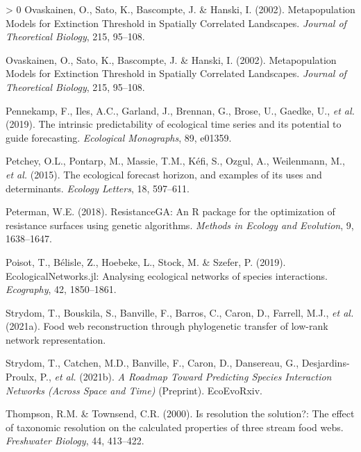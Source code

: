 \documentclass[11pt]{article}
\newlength{\cslhangindent}
\newenvironment{CSLReferences}[3] %
 {%
  \setlength{\parindent}{0pt}
  \ifodd #1 \everypar{\setlength{\hangindent}{\cslhangindent}}\ignorespaces\fi
  \ifnum #2 > 0
  \setlength{\parskip}{#2\baselineskip}
  \fi
 }%
 {}
\begin{document}
\begin{CSLReferences}{1}{0}
\leavevmode\hypertarget{ref-Ovaskainen2002MetMod}{}%
Ovaskainen, O., Sato, K., Bascompte, J. \& Hanski, I. (2002).
Metapopulation Models for Extinction Threshold in Spatially Correlated
Landscapes. \emph{Journal of Theoretical Biology}, 215, 95--108.

\leavevmode\hypertarget{ref-Ovaskainen2002MetMod}{}%
Ovaskainen, O., Sato, K., Bascompte, J. \& Hanski, I. (2002).
Metapopulation Models for Extinction Threshold in Spatially Correlated
Landscapes. \emph{Journal of Theoretical Biology}, 215, 95--108.

\leavevmode\hypertarget{ref-Pennekamp2019IntPre}{}%
Pennekamp, F., Iles, A.C., Garland, J., Brennan, G., Brose, U., Gaedke,
U., \emph{et al.} (2019). The intrinsic predictability of ecological
time series and its potential to guide forecasting. \emph{Ecological
Monographs}, 89, e01359.

\leavevmode\hypertarget{ref-Petchey2015EcoFor}{}%
Petchey, O.L., Pontarp, M., Massie, T.M., Kéfi, S., Ozgul, A.,
Weilenmann, M., \emph{et al.} (2015). The ecological forecast horizon,
and examples of its uses and determinants. \emph{Ecology Letters}, 18,
597--611.

\leavevmode\hypertarget{ref-Peterman2018ResRP}{}%
Peterman, W.E. (2018). ResistanceGA: An R package for the optimization
of resistance surfaces using genetic algorithms. \emph{Methods in
Ecology and Evolution}, 9, 1638--1647.

\leavevmode\hypertarget{ref-Poisot2019EcoJl}{}%
Poisot, T., Bélisle, Z., Hoebeke, L., Stock, M. \& Szefer, P. (2019).
EcologicalNetworks.jl: Analysing ecological networks of species
interactions. \emph{Ecography}, 42, 1850--1861.

\leavevmode\hypertarget{ref-Strydom2021FooWeb}{}%
Strydom, T., Bouskila, S., Banville, F., Barros, C., Caron, D., Farrell,
M.J., \emph{et al.} (2021a). Food web reconstruction through
phylogenetic transfer of low-rank network representation.

\leavevmode\hypertarget{ref-Strydom2021RoaPre}{}%
Strydom, T., Catchen, M.D., Banville, F., Caron, D., Dansereau, G.,
Desjardins-Proulx, P., \emph{et al.} (2021b). \emph{A Roadmap Toward
Predicting Species Interaction Networks (Across Space and Time)}
(Preprint). EcoEvoRxiv.

\leavevmode\hypertarget{ref-Thompson2000ResSol}{}%
Thompson, R.M. \& Townsend, C.R. (2000). Is resolution the solution?:
The effect of taxonomic resolution on the calculated properties of three
stream food webs. \emph{Freshwater Biology}, 44, 413--422.


\end{CSLReferences}
\end{document}
